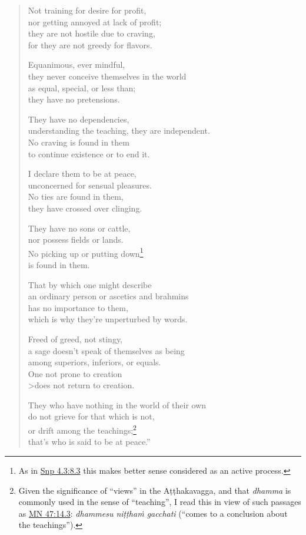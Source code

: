 \documentclass[12pt,openany]{book}%
\begin{document}
\begin{verse}
Not training for desire for profit, \\
nor getting annoyed at lack of profit; \\
they are not hostile due to craving, \\
for they are not greedy for flavors. 

Equanimous, ever mindful, \\
they never conceive themselves in the world \\
as equal, special, or less than; \\
they have no pretensions. 

They have no dependencies, \\
understanding the teaching, they are independent. \\
No craving is found in them \\
to continue existence or to end it. 

I declare them to be at peace, \\
unconcerned for sensual pleasures. \\
No ties are found in them, \\
they have crossed over clinging. 

They have no sons or cattle, \\
nor possess fields or lands. \\
No picking up or putting down\footnote{As in \href{https://suttacentral.net/snp4.3/en/sujato\#8.3}{Snp 4.3:8.3} this makes better sense considered as an active process. } \\
is found in them. 

That by which one might describe \\
an ordinary person or ascetics and brahmins \\
has no importance to them, \\
which is why they’re unperturbed by words. 

Freed of greed, not stingy, \\
a sage doesn’t speak of themselves as being \\
among superiors, inferiors, or equals. \\
One not prone to creation \\>does not return to creation. 

They who have nothing in the world of their own \\
do not grieve for that which is not, \\
or drift among the teachings;\footnote{Given the significance of “views” in the \textsanskrit{Aṭṭhakavagga}, and that \textit{dhamma} is commonly used in the sense of “teaching”, I read this in view of such passages as \href{https://suttacentral.net/mn47/en/sujato\#14.3}{MN 47:14.3}: \textit{dhammesu \textsanskrit{niṭṭhaṁ} gacchati} (“comes to a conclusion about the teachings”). } \\
that’s who is said to be at peace.” 

%
\end{verse}
\end{document}
